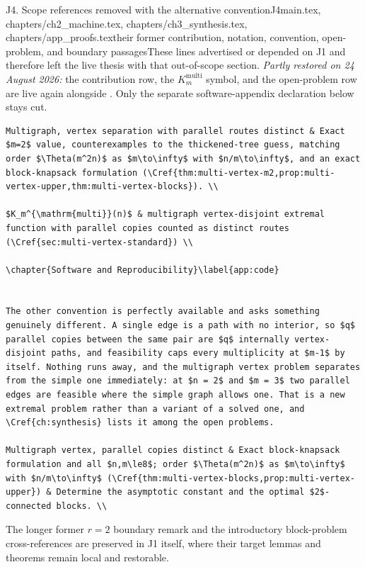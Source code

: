 \begin{offcut}{J4. Scope references removed with the alternative convention}{J4}{main.tex, chapters/ch2\_machine.tex, chapters/ch3\_synthesis.tex, chapters/app\_proofs.tex}{their former contribution, notation, convention, open-problem, and boundary passages}{These lines advertised or depended on J1 and therefore left the live thesis with that out-of-scope section.}
\emph{Partly restored on 24 August 2026:} the contribution row, the $K_m^{\mathrm{multi}}$ symbol, and the open-problem row are live again alongside . Only the separate software-appendix declaration below stays cut.

\begin{lstlisting}[language={[LaTeX]TeX},basicstyle=\ttfamily\scriptsize,breaklines=true]
Multigraph, vertex separation with parallel routes distinct & Exact $m=2$ value, counterexamples to the thickened-tree guess, matching order $\Theta(m^2n)$ as $m\to\infty$ with $n/m\to\infty$, and an exact block-knapsack formulation (\Cref{thm:multi-vertex-m2,prop:multi-vertex-upper,thm:multi-vertex-blocks}). \\

$K_m^{\mathrm{multi}}(n)$ & multigraph vertex-disjoint extremal function with parallel copies counted as distinct routes (\Cref{sec:multi-vertex-standard}) \\

\chapter{Software and Reproducibility}\label{app:code}


The other convention is perfectly available and asks something genuinely different. A single edge is a path with no interior, so $q$ parallel copies between the same pair are $q$ internally vertex-disjoint paths, and feasibility caps every multiplicity at $m-1$ by itself. Nothing runs away, and the multigraph vertex problem separates from the simple one immediately: at $n = 2$ and $m = 3$ two parallel edges are feasible where the simple graph allows one. That is a new extremal problem rather than a variant of a solved one, and \Cref{ch:synthesis} lists it among the open problems.

Multigraph vertex, parallel copies distinct & Exact block-knapsack formulation and all $n,m\le8$; order $\Theta(m^2n)$ as $m\to\infty$ with $n/m\to\infty$ (\Cref{thm:multi-vertex-blocks,prop:multi-vertex-upper}) & Determine the asymptotic constant and the optimal $2$-connected blocks. \\
\end{lstlisting}

The longer former $r=2$ boundary remark and the introductory block-problem cross-references are preserved in J1 itself, where their target lemmas and theorems remain local and restorable.
\end{offcut}

